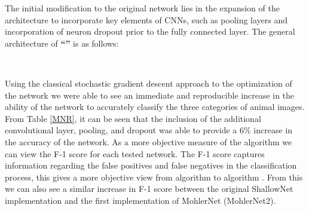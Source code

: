 \documentclass[12pt]{article}
\begin{document}
The initial modification to the original network lies in the expansion of the architecture to incorporate key elements of CNNs, such as pooling layers and incorporation of neuron dropout prior to the fully connected layer. The general architecture of \textbf{``''} is as follows: 
\begin{center}
	 \\
\end{center}
Using the classical stochastic gradient descent approach to the optimization of the network we were able to see an immediate and reproducible increase in the ability of the network to accurately classify the three categories of animal images.  From Table \ref{MNR}, it can be seen that the inclusion of the additional convolutional layer, pooling, and dropout was able to provide a $6\%$ increase in the accuracy of the network. As a more objective measure of the algorithm we can view the F-1 score for each tested network. The F-1 score captures information regarding the false positives and false negatives in the classification process, this gives a more objective view from algorithm to algorithm . From this we can also see a similar increase in F-1 score between the original ShallowNet implementation and the first implementation of MohlerNet (MohlerNet2). 
\end{document}
